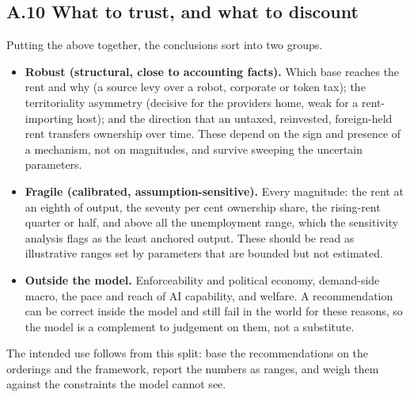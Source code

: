 \documentclass[11pt]{article}
\providecommand{\tightlist}{\setlength{\itemsep}{0pt}\setlength{\parskip}{0pt}}
\begin{document}
\hypertarget{a.10-what-to-trust-and-what-to-discount}{%
\subsection{A.10 What to trust, and what to
discount}\label{a.10-what-to-trust-and-what-to-discount}}

Putting the above together, the conclusions sort into two groups.

\begin{itemize}
\tightlist
\item
  \textbf{Robust (structural, close to accounting facts).} Which base
  reaches the rent and why (a source levy over a robot, corporate or
  token tax); the territoriality asymmetry (decisive for the
  provider\textquotesingle s home, weak for a rent-importing host); and
  the direction that an untaxed, reinvested, foreign-held rent transfers
  ownership over time. These depend on the sign and presence of a
  mechanism, not on magnitudes, and survive sweeping the uncertain
  parameters.
\item
  \textbf{Fragile (calibrated, assumption-sensitive).} Every magnitude:
  the rent at an eighth of output, the seventy per cent ownership share,
  the rising-rent quarter or half, and above all the unemployment range,
  which the sensitivity analysis flags as the least anchored output.
  These should be read as illustrative ranges set by parameters that are
  bounded but not estimated.
\item
  \textbf{Outside the model.} Enforceability and political economy,
  demand-side macro, the pace and reach of AI capability, and welfare. A
  recommendation can be correct inside the model and still fail in the
  world for these reasons, so the model is a complement to judgement on
  them, not a substitute.
\end{itemize}

The intended use follows from this split: base the recommendations on
the orderings and the framework, report the numbers as ranges, and weigh
them against the constraints the model cannot see.
\end{document}
